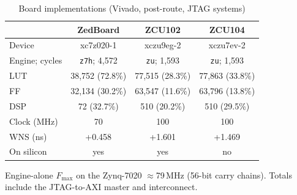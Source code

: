 \documentclass[conference]{IEEEtran}
\begin{document}
\begin{table}[!t]
\centering
\caption{Board implementations (Vivado, post-route, JTAG systems)}
\label{tab:impl}
\footnotesize
\setlength{\tabcolsep}{2.4pt}
\begin{tabular}{@{}lccc@{}}
\toprule
& \textbf{ZedBoard} & \textbf{ZCU102} & \textbf{ZCU104}\\
\midrule
Device & xc7z020-1 & xczu9eg-2 & xczu7ev-2\\
Engine; cycles & \texttt{z7h}; 4,572 & \texttt{zu}; 1,593 & \texttt{zu}; 1,593\\
LUT & 38,752 (72.8\%) & 77,515 (28.3\%) & 77,863 (33.8\%)\\
FF & 32,134 (30.2\%) & 63,547 (11.6\%) & 63,796 (13.8\%)\\
DSP & 72 (32.7\%) & 510 (20.2\%) & 510 (29.5\%)\\
Clock (MHz) & 70 & 100 & 100\\
WNS (ns) & +0.458 & +1.601 & +1.469\\
On silicon & yes & yes & no\\
\bottomrule
\end{tabular}
\par\vspace{2pt}\parbox{\columnwidth}{\scriptsize Engine-alone $F_{\max}$ on the Zynq-7020 $\approx$79\,MHz (56-bit carry chains). Totals include the JTAG-to-AXI master and interconnect.}
\end{table}
\end{document}
